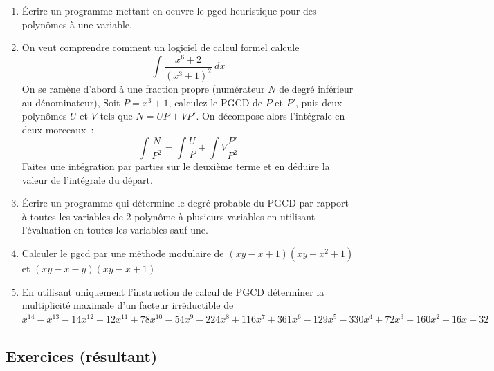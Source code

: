 \documentclass[a4paper,11pt]{article}
\begin{document}
\begin{giacjshere}
\begin{enumerate}
\item \'Ecrire un programme mettant en oeuvre le pgcd heuristique
pour des polyn\^omes \`a une variable.

\item On veut comprendre comment un logiciel de calcul formel calcule
\[ \int \frac{x^6+2}{(x^3+1)^2} \ dx \]
On se ramène d'abord à une fraction propre (num\'erateur $N$ de degr\'e 
inf\'erieur au d\'enominateur),
Soit $P=x^3+1$, calculez le PGCD de $P$ et $P'$, puis
deux polyn\^omes $U$ et $V$ tels que $ N=UP+VP' $.
On d\'ecompose alors l'int\'egrale en deux morceaux~:\\
\[ \int \frac{N}{P^2}=\int \frac{U}{P}  + \int V \frac{P'}{P^2}  \]
Faites une int\'egration par parties sur le deuxi\`eme terme
et en d\'eduire la valeur de l'int\'egrale du d\'epart.


\item \'Ecrire un programme qui d\'etermine le degr\'e probable du PGCD 
par rapport \`a toutes les
variables de 2 polyn\^ome \`a plusieurs variables
en utilisant l'\'evaluation en toutes les variables
sauf une.

\item Calculer le pgcd par une m\'ethode modulaire de
$(xy-x+1)(xy+x^2+1)$ et $(xy-x-y)(xy-x+1)$

\item En utilisant uniquement l'instruction de calcul de PGCD
d\'eterminer la multiplicit\'e maximale d'un facteur irr\'eductible
de 
$x^{14}-x^{13}-14x^{12}+12x^{11}+78x^{10}-54x^9-224x^8+116x^7+361x^6-129x^5-330x^4+72x^3+160x^2-16x-32$

\end{enumerate}


\subsection{Exercices (r\'esultant)}


\end{giacjshere}
\end{document}

